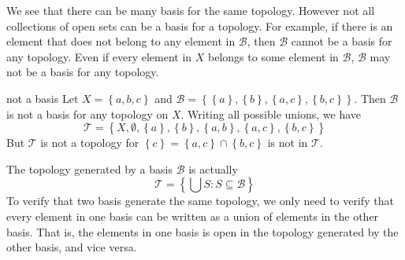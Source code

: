 \documentclass[../main.tex]{subfiles}
\begin{document}
We see that there can be many basis for the same topology. However not all collections of open sets can be a basis for a topology. For example, if there is an element that does not belong to any element in $\mathcal{B}$, then $\mathcal{B}$ cannot be a basis for any topology. Even if every element in $X$ belongs to some element in $\mathcal{B}$, $\mathcal{B}$ may not be a basis for any topology.
\begin{example}{}{not a basis}
	Let $X = \left\{ a,b,c \right\}$ and $\mathcal{B} = \left\{ \left\{ a \right\}, \left\{ b \right\}, \left\{ a,c \right\}, \left\{ b,c \right\} \right\}$. Then $\mathcal{B}$ is not a basis for any topology on $X$. Writing all possible unions, we have
	\begin{equation*}
	\mathcal{T} = \left\{ X, \emptyset , \left\{ a \right\}, \left\{ b \right\}, \left\{ a,b \right\}, \left\{ a,c \right\}, \left\{ b,c \right\} \right\}
	\end{equation*}
	But $\mathcal{T} $ is not a topology for $\left\{ c \right\} = \left\{ a,c \right\}\cap \left\{ b,c \right\}$ is not in $\mathcal{T}$.
\end{example}

\begin{remark}
The topology generated by a basis $\mathcal{B}$ is actually
\begin{equation*}
	\mathcal{T} = \left\{ \bigcup S: S \subseteq \mathcal{B} \right\}
\end{equation*}
To verify that two basis generate the same topology, we only need to verify that every element in one basis can be written as a union of elements in the other basis. That is, the elements in one basis is open in the topology generated by the other basis, and vice versa.
\end{remark}
\end{document}
